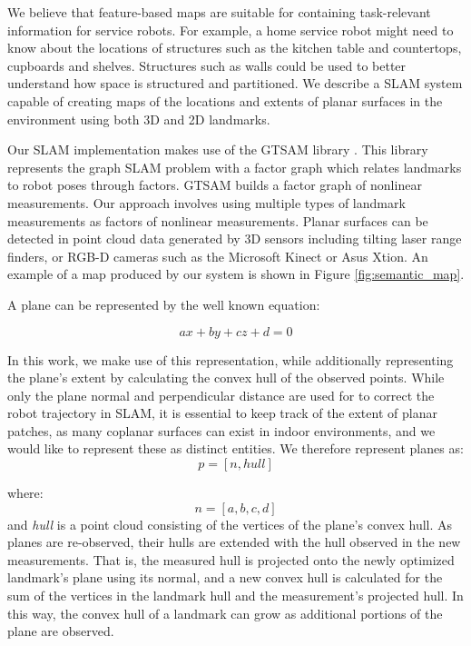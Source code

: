\documentclass[3p]{elsarticle}
\begin{document}
We believe that feature-based maps are suitable for containing task-relevant information for service robots. For example, a home service robot might need to know
about the locations of structures such as the kitchen table and countertops, cupboards and shelves. Structures such as walls could be used to better understand how space is
structured and partitioned. We describe a SLAM system capable of creating maps of
the locations and extents of planar surfaces in the environment using both 3D and 2D landmarks.

Our SLAM implementation makes use of the GTSAM library \cite{dellaert2006square}. This library
represents the graph SLAM problem with a factor graph which relates landmarks to
robot poses through factors. GTSAM builds a factor graph of nonlinear measurements. Our approach involves using multiple types of landmark measurements as factors of nonlinear measurements. Planar surfaces can be detected in point cloud data generated by 3D sensors including tilting laser range finders, or RGB-D cameras such as the Microsoft Kinect or Asus Xtion. An example of a map produced
by our system is shown in Figure \ref{fig:semantic_map}.

A plane can be represented by the well known equation:

\begin{equation}
ax + by + cz + d = 0
\end{equation}

In this work, we make use of this representation, while additionally representing
the plane’s extent by calculating the convex hull of the observed points. While only
the plane normal and perpendicular distance are used for to correct the robot trajectory in SLAM, it is essential to keep track of the extent of planar patches, as many
coplanar surfaces can exist in indoor environments, and we would like to represent
these as distinct entities. We therefore represent planes as:
\begin{equation}
p = [n, hull]
\end{equation}

where:
\begin{equation}
n = [a, b, c, d]
\end{equation}
and \textit{hull} is a point cloud consisting of the vertices of the plane’s convex hull. As
planes are re-observed, their hulls are extended with the hull observed in the new
measurements. That is, the measured hull is projected onto the newly optimized
landmark’s plane using its normal, and a new convex hull is calculated for the sum
of the vertices in the landmark hull and the measurement’s projected hull. In this
way, the convex hull of a landmark can grow as additional portions of the plane are
observed.
\end{document}
